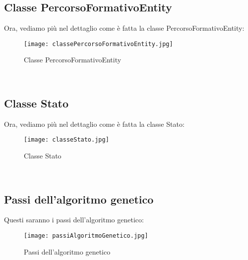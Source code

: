 \documentclass[10pt,a4paper]{article}
\begin{document}
  
     \subsection{Classe PercorsoFormativoEntity}
       \label{classePercorsoFormativoEntitySubsection}
       Ora, vediamo più nel dettaglio come è fatta la classe PercorsoFormativoEntity:\\
       \begin{figure}[h!]
         \centering
         \caption{Classe PercorsoFormativoEntity}
         \texttt{[image: classePercorsoFormativoEntity.jpg]}
         \label{classePercorsoFormativoEntity}
       \end{figure}\\
      
  
     \subsection{Classe Stato}
       \label{classeStatoSubsection}
       Ora, vediamo più nel dettaglio come è fatta la classe Stato:\\
       \begin{figure}[h!]
         \centering
         \caption{Classe Stato}
         \texttt{[image: classeStato.jpg]}
         \label{classeStato}
       \end{figure}\\
      
      \newpage
      
  
    \subsection{Passi dell'algoritmo genetico}
      \label{passiDellAlgoritmoGeneticoSubsection}
      Questi saranno i passi dell'algoritmo genetico:
      \begin{figure}[h!]
        \centering
        \caption{Passi dell'algoritmo genetico}
        \texttt{[image: passiAlgoritmoGenetico.jpg]}
        \label{passiAlgoritmoGenetico}
      \end{figure}\\
            
  
\end{document}
